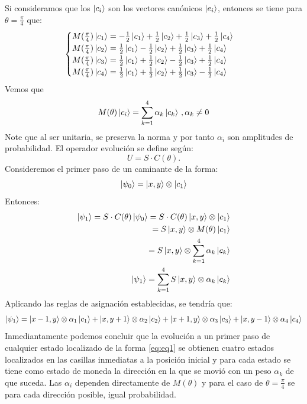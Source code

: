 \documentclass[12pt]{article}
\begin{document}
Si consideramos que los $\ket{c_i}$ son los vectores canónicos $\ket{e_i}$, entonces se tiene para $\theta=\frac{\pi}{4}$ que:
\begin{align*}
\begin{cases}
M(\frac{\pi}{4})\ket{c_1}=-\frac{1}{2}\ket{c_1}+\frac{1}{2}\ket{c_2}+\frac{1}{2}\ket{c_3}+\frac{1}{2}\ket{c_4}
\\
M(\frac{\pi}{4})\ket{c_2}=\frac{1}{2}\ket{c_1}-\frac{1}{2}\ket{c_2}+\frac{1}{2}\ket{c_3}+\frac{1}{2}\ket{c_4}
\\
M(\frac{\pi}{4})\ket{c_3}=\frac{1}{2}\ket{c_1}+\frac{1}{2}\ket{c_2}-\frac{1}{2}\ket{c_3}+\frac{1}{2}\ket{c_4}
\\
M(\frac{\pi}{4})\ket{c_4}=\frac{1}{2}\ket{c_1}+\frac{1}{2}\ket{c_2}+\frac{1}{2}\ket{c_3}-\frac{1}{2}\ket{c_4}
\end{cases}
\end{align*}
Vemos que
\begin{equation*}
M(\theta)\ket{c_i}=\sum_{k=1}^{4}\alpha_k \ket{c_k}\, , \alpha_k \neq 0
\end{equation*}
Note que al ser unitaria, se preserva la norma y por tanto $\alpha_i$ son amplitudes de probabilidad.
El operador evolución se define según:
\begin{equation}
U=S\cdot C(\theta).
\end{equation}
Consideremos el primer paso de un caminante de la forma:
\begin{equation}
    \ket{\psi_0}=\ket{x,y}\otimes\ket{c_1}
\end{equation}
Entonces:
\begin{align*}
\ket{\psi_1}= S\cdot C(\theta)\ket{\psi_0}=S\cdot C(\theta)\ket{x,y}\otimes\ket{c_1}
\\
=S\ket{x,y}\otimes M(\theta)\ket{c_1}
\\
=S\ket{x,y}\otimes \sum_{k=1}^{4}\alpha_k \ket{c_k}
\\
\ket{\psi_1}=\sum_{k=1}^{4}S\ket{x,y}\otimes \alpha_k \ket{c_k}
\end{align*}
Aplicando las reglas de asignación establecidas, se tendría que:
\begin{equation}
    \ket{\psi_1}=\ket{x-1,y}\otimes \alpha_1 \ket{c_1}+\ket{x,y+1}\otimes \alpha_2 \ket{c_2}+\ket{x+1,y}\otimes \alpha_3 \ket{c_3}
    +\ket{x,y-1}\otimes \alpha_4 \ket{c_4}
\end{equation}
Inmediantamente podemos concluir que la evolución a un primer paso de cualquier estado localizado de la forma \eqref{eq:eq1} se obtienen cuatro estados localizados en las casillas inmediatas a la posición inicial
y para cada estado se tiene como estado de moneda la dirección en la que se movió con un peso $\alpha_k$ de que suceda.
Las $\alpha_i$ dependen directamente de $M(\theta)$ y para el caso de $\theta=\frac{\pi}{4}$ se para cada dirección posible, igual probabilidad.
\end{document}
